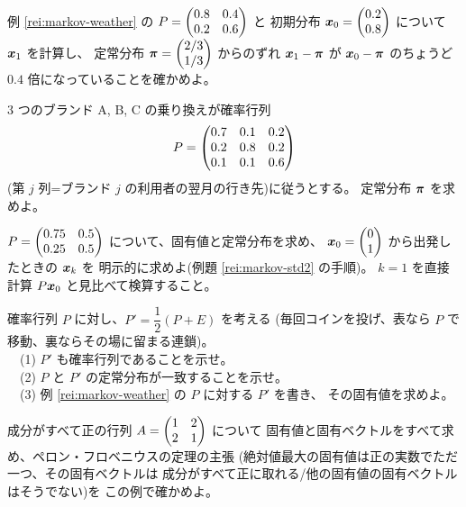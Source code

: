 \begin{mondai}[基本]\label{q:markov-ex4}
例 \ref{rei:markov-weather} の $P = \begin{pmatrix}0.8 & 0.4 \\ 0.2 & 0.6\end{pmatrix}$ と
初期分布 $\bm{x}_0 = \begin{pmatrix}0.2 \\ 0.8\end{pmatrix}$ について $\bm{x}_1$ を計算し、
定常分布 $\bm{\pi} = \begin{pmatrix}2/3 \\ 1/3\end{pmatrix}$ からのずれ
$\bm{x}_1 - \bm{\pi}$ が $\bm{x}_0 - \bm{\pi}$ のちょうど
$0.4$ 倍になっていることを確かめよ。
\end{mondai}

\begin{mondai}[標準]\label{q:markov-ex5}
$3$ つのブランド A, B, C の乗り換えが確率行列
\[
P = \begin{pmatrix}0.7 & 0.1 & 0.2 \\ 0.2 & 0.8 & 0.2 \\ 0.1 & 0.1 & 0.6\end{pmatrix}
\]
(第 $j$ 列=ブランド $j$ の利用者の翌月の行き先)に従うとする。
定常分布 $\bm{\pi}$ を求めよ。
\end{mondai}

\begin{mondai}[標準]\label{q:markov-ex6}
$P = \begin{pmatrix}0.75 & 0.5 \\ 0.25 & 0.5\end{pmatrix}$ について、固有値と定常分布を求め、
$\bm{x}_0 = \begin{pmatrix}0 \\ 1\end{pmatrix}$ から出発したときの $\bm{x}_k$ を
明示的に求めよ(例題 \ref{rei:markov-std2} の手順)。
$k = 1$ を直接計算 $P\bm{x}_0$ と見比べて検算すること。
\end{mondai}

\begin{mondai}[標準]\label{q:markov-ex7}
確率行列 $P$ に対し、$P' = \dfrac{1}{2}(P + E)$ を考える
(毎回コインを投げ、表なら $P$ で移動、裏ならその場に留まる連鎖)。\\
　(1) $P'$ も確率行列であることを示せ。\\
　(2) $P$ と $P'$ の定常分布が一致することを示せ。\\
　(3) 例 \ref{rei:markov-weather} の $P$ に対する $P'$ を書き、
その固有値を求めよ。
\end{mondai}

\begin{mondai}[標準]\label{q:markov-ex8}
成分がすべて正の行列 $A = \begin{pmatrix}1 & 2 \\ 2 & 1\end{pmatrix}$ について
固有値と固有ベクトルをすべて求め、ペロン・フロベニウスの定理の主張
(絶対値最大の固有値は正の実数でただ一つ、その固有ベクトルは
成分がすべて正に取れる/他の固有値の固有ベクトルはそうでない)を
この例で確かめよ。
\end{mondai}

